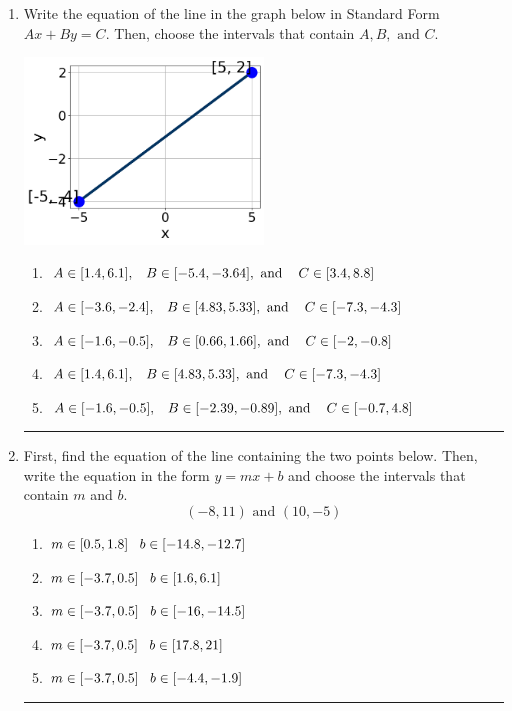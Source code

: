\documentclass[14pt]{extbook}
\newcommand{\litem}[1]{\item#1\hspace*{-1cm}\rule{\textwidth}{0.4pt}}
\begin{document}
\begin{enumerate}
{\begin{enumerate}[label=\Alph*.]
\end{enumerate} }
\litem{
Write the equation of the line in the graph below in Standard Form $Ax+By=C$. Then, choose the intervals that contain $A, B, \text{ and } C$.
\begin{center}
    \includegraphics[width=0.5\textwidth]{../Figures/linearGraphToStandardC.png}
\end{center}
\begin{enumerate}[label=\Alph*.]
\item \( A \in [1.4, 6.1], \hspace{3mm} B \in [-5.4, -3.64], \text{ and } \hspace{3mm} C \in [3.4, 8.8] \)
\item \( A \in [-3.6, -2.4], \hspace{3mm} B \in [4.83, 5.33], \text{ and } \hspace{3mm} C \in [-7.3, -4.3] \)
\item \( A \in [-1.6, -0.5], \hspace{3mm} B \in [0.66, 1.66], \text{ and } \hspace{3mm} C \in [-2, -0.8] \)
\item \( A \in [1.4, 6.1], \hspace{3mm} B \in [4.83, 5.33], \text{ and } \hspace{3mm} C \in [-7.3, -4.3] \)
\item \( A \in [-1.6, -0.5], \hspace{3mm} B \in [-2.39, -0.89], \text{ and } \hspace{3mm} C \in [-0.7, 4.8] \)

\end{enumerate} }
\litem{
First, find the equation of the line containing the two points below. Then, write the equation in the form $ y=mx+b $ and choose the intervals that contain $m$ and $b$.\[ (-8, 11) \text{ and } (10, -5) \]\begin{enumerate}[label=\Alph*.]
\item \( m \in [0.5, 1.8] \hspace*{3mm} b \in [-14.8, -12.7] \)
\item \( m \in [-3.7, 0.5] \hspace*{3mm} b \in [1.6, 6.1] \)
\item \( m \in [-3.7, 0.5] \hspace*{3mm} b \in [-16, -14.5] \)
\item \( m \in [-3.7, 0.5] \hspace*{3mm} b \in [17.8, 21] \)
\item \( m \in [-3.7, 0.5] \hspace*{3mm} b \in [-4.4, -1.9] \)


\end{enumerate}}
\end{enumerate}
\end{document}
